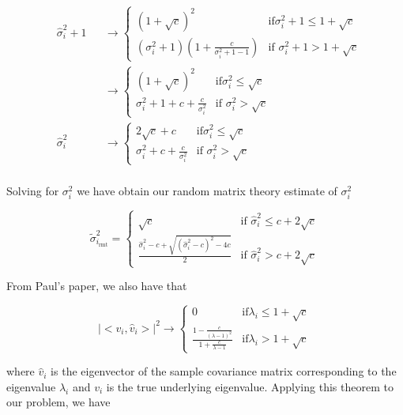 \documentclass[english]{article}
\begin{document}
\begin{equation}
\begin{aligned}
&\hat{\sigma}^2_i+1
&&\to\begin{cases}
\left(1+\sqrt{c}\right)^2 & \text{if} \sigma_i^2+1\leq 1+\sqrt{c}\\
(\sigma^2_i+1)\left(1+\frac{c}{\sigma_i^2+1-1}\right) & \text{if } \sigma_i^2+1>1+\sqrt{c}
\end{cases}\\
&&&\to\begin{cases}
\left(1+\sqrt{c}\right)^2 & \text{if} \sigma_i^2\leq \sqrt{c}\\
\sigma_i^2+1+c+\frac{c}{\sigma_i^2} & \text{if } \sigma_i^2>\sqrt{c}
\end{cases}\\
&\hat{\sigma}^2_i
&&\to\begin{cases}
2\sqrt{c}+c & \text{if} \sigma_i^2\leq \sqrt{c}\\
\sigma_i^2+c+\frac{c}{\sigma_i^2} & \text{if } \sigma_i^2>\sqrt{c}
\end{cases}\\
\end{aligned}
\end{equation}

Solving for $\sigma_i^2$ we have obtain our random matrix theory estimate of $\sigma_i^2$

\begin{equation}\label{eq:cov}
\tilde{\sigma}_{i_\text{rmt}}^2 = 
\begin{cases}
\sqrt{c} & \text{if } \hat{\sigma}_i^2 \leq c + 2\sqrt{c}\\
\frac{\hat{\sigma}_i^2-c+\sqrt{\left(\hat{\sigma}_i^2-c\right)^2-4c}}{2} & \text{if } \hat{\sigma}_i^2 > c + 2\sqrt{c}
\end{cases}
\end{equation}

From Paul's paper, we also have that

\begin{equation}
|<v_i,\hat{v}_i>|^2 \to
\begin{cases}
0 & \text{if} \lambda_i\leq 1+\sqrt{c}\\
\frac{1-\frac{c}{(\lambda-1)^2}}{1+\frac{c}{\lambda-1}} & \text{if} \lambda_i>1+\sqrt{c}
\end{cases}
\end{equation}

where $\hat{v}_i$ is the eigenvector of the sample covariance matrix corresponding to the eigenvalue $\lambda_i$ and $v_i$ is the true underlying eigenvalue. Applying this theorem to our problem, we have
\end{document}
